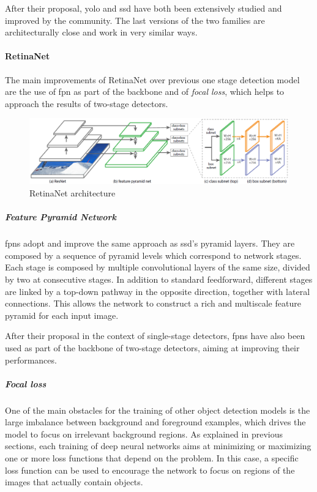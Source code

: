 \documentclass[%
    corpo=12pt,
    twoside,
    stile=classica,   
    tipotesi=magistrale,
    evenboxes,
    english,
	numerazioneromana,
]{toptesi}
\begin{document}
After their proposal, \gls{yolo} and \gls{ssd} have both been extensively studied and improved by the community. The last versions of the two families are architecturally close and work in very similar ways.

\paragraph{RetinaNet}
The main improvements of RetinaNet\cite{lin2018focal} over previous one stage detection model are the use of \gls{fpn} as part of the backbone and of \textit{focal loss}, which helps to approach the results of two-stage detectors.

\begin{figure}[b]
	\centering
	\includegraphics[width=\linewidth]{imgs/retinanet.png}
	\caption{RetinaNet architecture\cite{lin2018focal}}
	\label{fig:retinanet}
\end{figure}

\subparagraph{Feature Pyramid Network}
\glspl{fpn}\cite{lin2017feature} adopt and improve the same approach as \acrshort{ssd}'s pyramid layers. They are composed by a sequence of pyramid levels which correspond to network stages. Each stage is composed by multiple convolutional layers of the same size, divided by two at consecutive stages. In addition to standard feedforward, different stages are linked by a top-down pathway in the opposite direction, together with lateral connections. This allows the network to construct a rich and multiscale feature pyramid for each input image.

After their proposal in the context of single-stage detectors, \glspl{fpn} have also been used as part of the backbone of two-stage detectors, aiming at improving their performances.

\subparagraph{Focal loss}
One of the main obstacles for the training of other object detection models is the large imbalance between background and foreground examples, which drives the model to focus on irrelevant background regions.
As explained in previous sections, each training of deep neural networks aims at minimizing or maximizing one or more loss functions that depend on the problem.
In this case, a specific loss function can be used to encourage the network to focus on regions of the images that actually contain objects.
\end{document}
